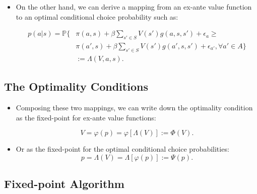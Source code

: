 \documentclass[]{book}
\providecommand{\tightlist}{%
  \setlength{\itemsep}{0pt}\setlength{\parskip}{0pt}}
\begin{document}
\begin{itemize}
\tightlist
\item
  On the other hand, we can derive a mapping from an ex-ante value
  function to an optimal conditional choice probability such as:

  \begin{equation}
  \begin{split}
  p(a|s) = \mathbb{P}\Bigg\{&\pi(a , s) + \beta \sum_{s' \in S} V(s') g(a, s, s') + \epsilon_a \ge\\
  &\pi(a' , s) + \beta \sum_{s' \in S} V(s') g(a', s, s') + \epsilon_{a'}, \forall a' \in A \Bigg\}\\
  &:= \Lambda(V, a, s).
  \end{split}
  \end{equation}
\end{itemize}

\subsection{The Optimality Conditions}\label{the-optimality-conditions}

\begin{itemize}
\tightlist
\item
  Composing these two mappings, we can write down the optimality
  condition as the fixed-point for ex-ante value functions:

  \begin{equation}
  V = \varphi(p) = \varphi[\Lambda(V)] := \Phi(V).
  \end{equation}
\item
  Or as the fixed-point for the optimal conditional choice
  probabilities: \[
  p = \Lambda(V) = \Lambda[\varphi(p)] := \Psi(p).
  \]
\end{itemize}

\subsection{Fixed-point Algorithm}\label{fixed-point-algorithm}
\end{document}
